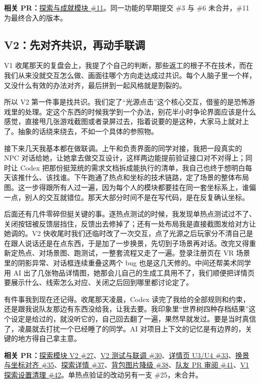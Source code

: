 \textbf{相关 PR：}\href{https://github.com/214notfound/jiedeng/pull/11}{探索与成就模块 \#11}。同一功能的早期提交 \#3 与 \#6 未合并，\#11 为最终合入的版本。

\subsection{V2：先对齐共识，再动手联调}

V1 收尾那天的复盘会上，我提了个自己的判断，那些返工的根子不在技术，而在我们从来没就交互怎么做、画面往哪个方向走达成过共识。每个人脑子里一个样，又没什么有效的办法对齐，最后拼到一起风格就是割裂的。

所以 V2 第一件事是找共识。我们定了“光源点击”这个核心交互，借鉴的是恐怖游戏里的处理。定这个东西的时候我学到一个办法，别花半小时争论界面应该是什么感觉，直接甩几张游戏截图或者录屏过去，指着说要的是这种，大家马上就对上了。抽象的话绕来绕去，不如一个具体的参照物。

接下来几天我基本都在做联调。上午和负责界面的同学对接，我把一段真实的 NPC 对话给她，让她拿去做交互设计，这样两边能提前验证接口对不对得上；同时让 Codex 把那份挺笼统的需求文档拆成能执行的清单，我自己也终于想明白每天该推什么、该找谁。下午跑通了热点和坐标的技术链路，定了场景的整体布局图。这一步得跟所有人过一遍，因为每个人的模块都要挂在同一套坐标系上，谁偏一点，别人的交互就错位。那天大部分时间不是在写代码，是在反复确认坐标。

后面还有几件零碎但挺关键的事。逐热点测试的时候，我发现单热点测试过不了、关闭按钮被反馈层挡住，反馈出去修掉了；还有一处布局我是直接截图发给对方让她调的。V2 快收尾时我们还临时改了一次交互，点了光源之后玩家分不清自己是在跟人说话还是在点东西，于是加了一步换景，先切到子场景再对话。改完又得重新定热点、对场景图、跑测试，一整套流程又走了一遍。登录注册页在 VR 场景里的阴影异常、对话框连续重叠这两个 bug 也是这几天修的。中间还帮美术同学用 AI 出了几张物品详情图，她那会儿自己的生成工具用不了，我们顺便把详情页要展示什么、线索怎么对应、关闭之后回到哪里都讨论定了。

有件事我到现在还记得。收尾那天凌晨，Codex 读完了我给的全部规则和约束，还是跟我说队友那边有东西没给我，让我去要。我印象里“世界树四种存档结果”这个设定是给过的，就没听它的，自己回去翻了一遍，果然早就发过。要是当时真信了，凌晨就去打扰一个已经睡了的同学。AI 对项目上下文的记忆是有边界的，关键的地方得自己拿主意。

\textbf{相关 PR：}\href{https://github.com/214notfound/jiedeng/pull/27}{探索模块 V2 \#27}、\href{https://github.com/214notfound/jiedeng/pull/30}{V2 测试与联调 \#30}、\href{https://github.com/214notfound/jiedeng/pull/33}{详情页 U3/U4 \#33}、\href{https://github.com/214notfound/jiedeng/pull/35}{换景与坐标对齐 \#35}、\href{https://github.com/214notfound/jiedeng/pull/37}{探索详情 \#37}、\href{https://github.com/214notfound/jiedeng/pull/38}{背包图片降级 \#38}、\href{https://github.com/214notfound/jiedeng/pull/41}{队友 PR 审阅 \#41}、\href{https://github.com/214notfound/jiedeng/pull/42}{V1 探索设置清理 \#42}。单热点验证的改动另有一支 \#25，未合并。

